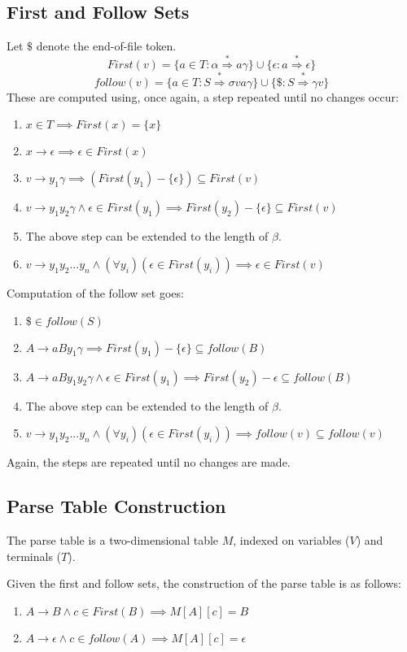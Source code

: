 \documentclass[titlepage]{article}
\newcommand{\deriv}{\overset{*}{\Rightarrow}}
\newcommand{\ep}{\epsilon}
\begin{document}
		\subsection{First and Follow Sets}
		Let $\$$ denote the end-of-file token.
			\[ First(v) = \{a \in T: \alpha \deriv a\gamma\} \cup \{\ep : a \deriv \ep\} \]
			\[ follow(v) = \{a \in T: S \deriv \sigma v a \gamma\} \cup \{\$: S \deriv \gamma v\} \]
		These are computed using, once again, a step repeated until no changes occur:
		\begin{enumerate}
			\item $x \in T \implies First(x) = \{x\}$
			\item $x \rightarrow \ep \implies \ep \in First(x)$
			\item $v \rightarrow y_1\gamma \implies (First(y_1) - \{\ep\}) \subseteq First(v)$
			\item $v \rightarrow y_1y_2\gamma \land \ep \in First(y_1) \implies First(y_2)-\{\ep\} \subseteq First(v)$
			\item The above step can be extended to the length of $\beta$.
			\item $v \rightarrow y_1y_2...y_n \land (\forall y_i)(\ep \in First(y_i)) \implies \ep \in First(v)$
		\end{enumerate}

		Computation of the follow set goes:
		\begin{enumerate}
			\item $\$ \in follow(S)$
			\item $A \rightarrow aBy_1\gamma \implies First(y_1) - \{\ep\} \subseteq follow(B)$
			\item $A \rightarrow aBy_1y_2\gamma \land \ep \in First(y_1) \implies First(y_2) - \ep \subseteq follow(B)$
			\item The above step can be extended to the length of $\beta$.
			\item $v \rightarrow y_1y_2...y_n \land (\forall y_i)(\ep \in First(y_i)) \implies follow(v) \subseteq follow(v)$
		\end{enumerate}
		Again, the steps are repeated until no changes are made.
		
		\subsection{Parse Table Construction}
		The parse table is a two-dimensional table $M$, indexed on variables ($V$) and terminals ($T$).

		Given the first and follow sets, the construction of the parse table is as follows:
		\begin{enumerate}
			\item $A \rightarrow B \land c \in First(B) \implies M[A][c] = B$
			\item $A \rightarrow \ep \land c \in follow(A) \implies M[A][c] = \ep$
		\end{enumerate}
\end{document}
